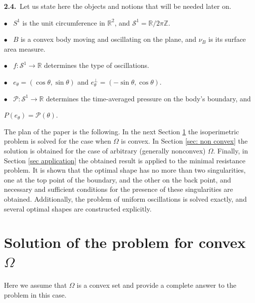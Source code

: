 \documentclass[a4paper,12pt]{article}
\DeclareMathOperator{\conv}{conv}
\newcommand {\PP}{P}
\newcommand {\PPP}{\mathcal{P}}
\newcommand {\SSS}{\mathcal{S}^1}
\theoremstyle{remark}
\theoremstyle{definition}
\begin{document}
\textbf{2.4.}\  Let us state here the objects and notions that will be needed later on.
\vspace{2mm}

$\bullet$ \ $S^1$ is the unit circumference in $\mathbb{R}^2$, and $\SSS=\mathbb{R}/2\pi\mathbb{Z}$.
\vspace{2mm}

$\bullet$ \ $B$ is a convex body moving and oscillating on the plane, and $\nu_B$ is its surface area measure.
\vspace{2mm}

$\bullet$ \ $f : \SSS \to \mathbb{R}$ determines the type of oscillations.
\vspace{2mm}

$\bullet$ \ $e_\theta =(\cos\theta,\sin\theta)$ and $e_\theta^\perp = (-\sin\theta,\cos\theta)$.
\vspace{2mm}

$\bullet$ \ $\PPP : \SSS \to \mathbb{R}$ determines the time-averaged pressure on the body's boundary, and

$\PP(e_\theta) = \PPP(\theta).$
\vspace{2mm}

The plan of the paper is the following. In the next Section \ref{sec: convex} the isoperimetric problem is solved for the case when $\Omega$ is convex. In Section \ref{sec: non convex} the solution is obtained for the case of arbitrary (generally nonconvex) $\Omega$. Finally, in Section \ref{sec application} the obtained result is applied to the minimal resistance problem. It is shown that the optimal shape has no more than two singularities, one at the top point of the boundary, and the other on the back point, and necessary and sufficient conditions for the presence of these singularities are obtained. Additionally, the problem of uniform oscillations is solved exactly, and several optimal shapes are constructed explicitly.



\section{Solution of the problem for convex \texorpdfstring{$\Omega$}{Ω}}\label{sec: convex}




Here we assume that $\Omega$ is a convex set and provide a complete answer to the problem in this case. %
\end{document}
